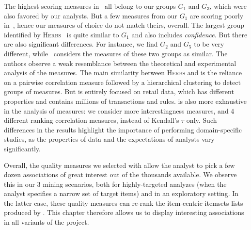 The highest scoring measures in~\cite{LeSANER15} all belong to our groups
$G_1$ and $G_3$, which were also favored by our analysts.
But a few measures from our $G_1$ are scoring poorly in~\cite{LeSANER15},
hence our measures of choice do not match theirs, overall.
The largest group identified by \textsc{Herbs}~\cite{Lenca2007,VaillantDS04} is quite similar to $G_1$ and also includes {\em confidence}.
But there are also significant differences.
For instance, we find $G_2$ and $G_5$ to be very different,
while~\cite{Lenca2007} considers the measures of these two groups as similar.
The authors observe a weak resemblance between the theoretical and experimental analysis of the measures.
The main similarity between \textsc{Herbs} and
\capa is the reliance on a pairwise correlation measure followed by a hierarchical clustering to detect groups of measures.
But \capa is entirely focused on retail data,
which has different properties and contains millions of transactions and rules.
\capa is also more exhaustive in the analysis of measures:
we consider more interestingness measures, and 4 different ranking correlation measures, instead of Kendall's $\tau$ only.
Such differences in the results highlight the importance of performing domain-specific studies,
as the properties of data and the expectations of analysts vary significantly.













Overall, the quality measures we selected with \capa allow the analyst to pick
a few dozen associations of great interest out of the thousands available.
We observe this in our 3 mining scenarios, both for highly-targeted analyzes
(when the analyst specifies a narrow set of target items)
and in an exploratory setting.
In the latter case, these quality measures can re-rank the item-centric itemsets lists produced by \toppi.
This chapter therefore allows us to display interesting associations in all variants of the \datalyse project.



